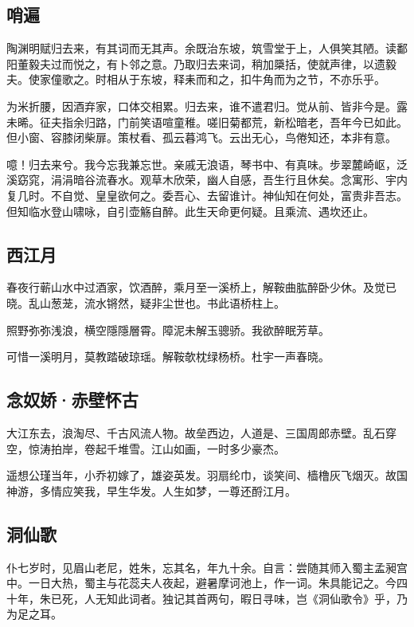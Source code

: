 \documentclass[a5paper]{ctexart}
\begin{document}
	\subsection{哨遍}
	\begin{small}
		陶渊明赋归去来，有其词而无其声。余既治东坡，筑雪堂于上，人俱笑其陋。读鄱阳董毅夫过而悦之，有卜邻之意。乃取归去来词，稍加檃括，使就声律，以遗毅夫。使家僮歌之。时相从于东坡，释耒而和之，扣牛角而为之节，不亦乐乎。
	\end{small}
	
	为米折腰，因酒弃家，口体交相累。归去来，谁不遣君归。觉从前、皆非今是。露未晞。征夫指余归路，门前笑语喧童稚。嗟旧菊都荒，新松暗老，吾年今已如此。但小窗、容膝闭柴扉。策杖看、孤云暮鸿飞。云出无心，鸟倦知还，本非有意。
	
	噫！归去来兮。我今忘我兼忘世。亲戚无浪语，琴书中、有真味。步翠麓崎岖，泛溪窈窕，涓涓暗谷流春水。观草木欣荣，幽人自感，吾生行且休矣。念寓形、宇内复几时。不自觉、皇皇欲何之。委吾心、去留谁计。神仙知在何处，富贵非吾志。但知临水登山啸咏，自引壶觞自醉。此生天命更何疑。且乘流、遇坎还止。
	
	\subsection{西江月}
	\begin{small}
		春夜行蕲山水中过酒家，饮酒醉，乘月至一溪桥上，解鞍曲肱醉卧少休。及觉已晓。乱山葱茏，流水锵然，疑非尘世也。书此语桥柱上。　
	\end{small}
	
	照野弥弥浅浪，横空隱隱層霄。障泥未解玉骢骄。我欲醉眠芳草。
	
	可惜一溪明月，莫教踏破琼瑶。解鞍欹枕绿杨桥。杜宇一声春晓。
	
	\subsection{念奴娇·赤壁怀古}
	大江东去，浪淘尽、千古风流人物。故垒西边，人道是、三国周郎赤壁。乱石穿空，惊涛拍岸，卷起千堆雪。江山如画，一时多少豪杰。
	
	遥想公瑾当年，小乔初嫁了，雄姿英发。羽扇纶巾，谈笑间、樯橹灰飞烟灭。故国神游，多情应笑我，早生华发。人生如梦，一尊还酹江月。
	
	\subsection{洞仙歌}
	\begin{small}
		仆七岁时，见眉山老尼，姓朱，忘其名，年九十余。自言：尝随其师入蜀主孟昶宫中。一日大热，蜀主与花蕊夫人夜起，避暑摩诃池上，作一词。朱具能记之。今四十年，朱已死，人无知此词者。独记其首两句，暇日寻味，岂《洞仙歌令》乎，乃为足之耳。
	\end{small}
	
\end{document}
